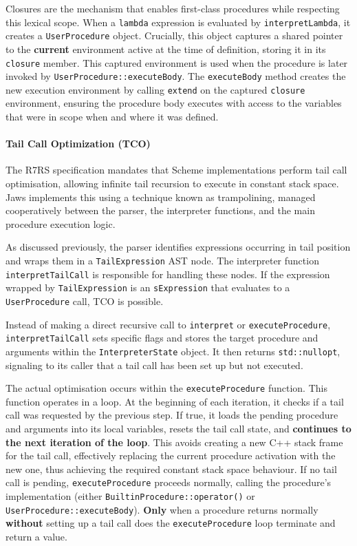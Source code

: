 \documentclass[final]{cmpreport_02}
\begin{document}
Closures are the mechanism that enables first-class procedures while respecting this lexical scope. When a \texttt{lambda} expression is evaluated by \texttt{interpretLambda}, it creates a \texttt{UserProcedure} object. Crucially, this object captures a shared pointer to the \textbf{current} environment active at the time of definition, storing it in its \texttt{closure} member. This captured environment is used when the procedure is later invoked by \texttt{UserProcedure::executeBody}. The \texttt{executeBody} method creates the new execution environment by calling \texttt{extend} on the captured \texttt{closure} environment, ensuring the procedure body executes with access to the variables that were in scope when and where it was defined.

\paragraph{Tail Call Optimization (TCO)}
The R7RS specification mandates that Scheme implementations perform tail call optimisation, allowing infinite tail recursion to execute in constant stack space. Jaws implements this using a technique known as trampolining, managed cooperatively between the parser, the interpreter functions, and the main procedure execution logic.

As discussed previously, the parser identifies expressions occurring in tail position and wraps them in a \texttt{TailExpression} AST node. The interpreter function \texttt{interpretTailCall} is responsible for handling these nodes. If the expression wrapped by \texttt{TailExpression} is an \texttt{sExpression} that evaluates to a \texttt{UserProcedure} call, TCO is possible.

Instead of making a direct recursive call to \texttt{interpret} or \texttt{executeProcedure}, \texttt{interpretTailCall} sets specific flags and stores the target procedure and arguments within the \texttt{InterpreterState} object. It then returns \texttt{std::nullopt}, signaling to its caller that a tail call has been set up but not executed.

The actual optimisation occurs within the \texttt{executeProcedure} function. This function operates in a loop. At the beginning of each iteration, it checks if a tail call was requested by the previous step. If true, it loads the pending procedure and arguments into its local variables, resets the tail call state, and \textbf{continues to the next iteration of the loop}. This avoids creating a new C++ stack frame for the tail call, effectively replacing the current procedure activation with the new one, thus achieving the required constant stack space behaviour. If no tail call is pending, \texttt{executeProcedure} proceeds normally, calling the procedure's implementation (either \texttt{BuiltinProcedure::operator()} or \texttt{UserProcedure::executeBody}). \textbf{Only} when a procedure returns normally \textbf{without} setting up a tail call does the \texttt{executeProcedure} loop terminate and return a value.
\end{document}
